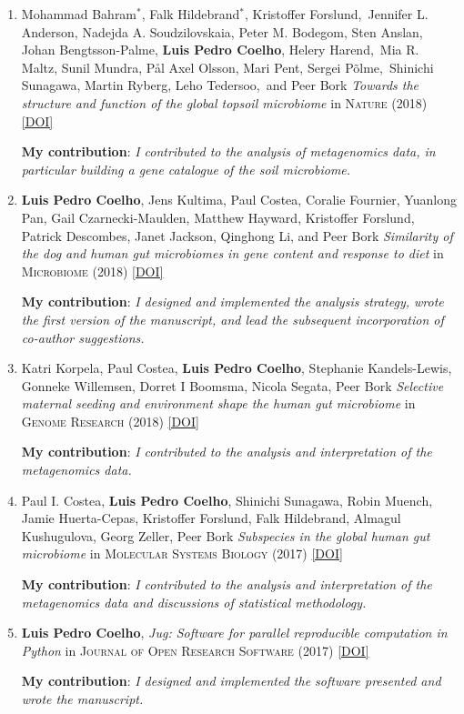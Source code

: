 \documentclass{article}
\newcommand\showdoi[1]{%
    \href{http://dx.doi.org/#1}{[DOI]}%
}
\newcommand\pubname[1]{\textsc{#1}}
\newcommand\contribution[1]{\relax\hfill\break\textbf{My contribution}: \textit{#1}}
\newcommand\costar{${}^{*}$}
\begin{document}
\begin{enumerate}[resume]
\item Mohammad Bahram\costar, Falk Hildebrand\costar, Kristoffer
Forslund, Jennifer L. Anderson, Nadejda A. Soudzilovskaia, Peter M. Bodegom,
Sten Anslan, Johan Bengtsson-Palme, \textbf{Luis Pedro Coelho}, Helery
Harend, Mia R. Maltz, Sunil Mundra, Pål Axel Olsson, Mari Pent, Sergei
Põlme, Shinichi Sunagawa, Martin Ryberg, Leho Tedersoo, and Peer Bork
\emph{Towards the structure and function
of the global topsoil microbiome} in \pubname{Nature} (2018)
\showdoi{10.1038/s41586-018-0386-6}
\contribution{I contributed to the analysis of metagenomics data, in particular
building a gene catalogue of the soil microbiome.}


\item \textbf{Luis Pedro Coelho}, Jens Kultima, Paul Costea, Coralie Fournier,
Yuanlong Pan, Gail Czarnecki-Maulden, Matthew Hayward, Kristoffer Forslund,
Patrick Descombes, Janet Jackson, Qinghong Li, and Peer Bork \emph{Similarity
of the dog and human gut microbiomes in gene content and response to diet} in
\pubname{Microbiome} (2018) \showdoi{10.1186/s40168-018-0450-3}
\contribution{I designed and implemented the analysis strategy, wrote the first
version of the manuscript, and lead the subsequent incorporation of co-author
suggestions.}

\item Katri Korpela, Paul Costea, \textbf{Luis Pedro Coelho}, Stephanie
Kandels-Lewis, Gonneke Willemsen, Dorret I Boomsma, Nicola Segata, Peer Bork
\emph{Selective maternal seeding and environment shape the human gut
microbiome} in \pubname{Genome Research} (2018) \showdoi{10.1101/gr.233940.117}
\contribution{I contributed to the analysis and interpretation of the
metagenomics data.}

\item Paul I. Costea, \textbf{Luis Pedro Coelho}, Shinichi Sunagawa, Robin
Muench, Jamie Huerta-Cepas, Kristoffer Forslund, Falk Hildebrand, Almagul
Kushugulova, Georg Zeller, Peer Bork \emph{Subspecies in the global human gut
microbiome} in \pubname{Molecular Systems Biology} (2017)
\showdoi{10.15252/msb.20177589}
\contribution{I contributed to the analysis and interpretation of the
metagenomics data and discussions of statistical methodology.}

\item \textbf{Luis Pedro Coelho}, \emph{Jug: Software for parallel reproducible
computation in Python} in \pubname{Journal of Open Research
Software} (2017) \showdoi{10.5334/jors.161}
\contribution{I designed and implemented the software presented and wrote the
manuscript.}


\end{enumerate}
\end{document}
